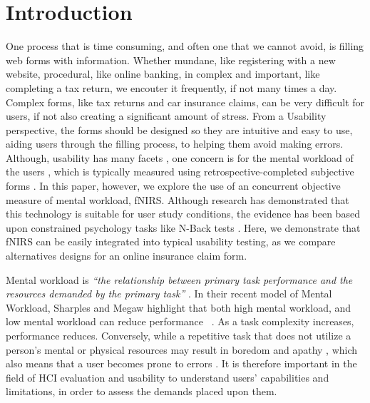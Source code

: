 \documentclass[../main/Feedback.tex]{subfiles}
\begin{document}
\section{Introduction}
One process that is time consuming, and often one that we cannot avoid, is filling web forms with information.
Whether mundane, like registering with a new website, procedural, like online banking, in complex and important, like completing a tax return, we encouter it frequently, if not many times a day. Complex forms, like tax returns and car insurance claims, can be very difficult for users, if not also creating a significant amount of stress.
From a Usability perspective, the forms should be designed so they are intuitive and easy to use, aiding users through the filling process, to helping them avoid making errors. Although, usability has many facets \cite{preece1994human}, one concern is for the mental workload of the users \cite{bevan1997methods}, which is typically measured using retrospective-completed subjective forms \cite{nasa-tlx}. In this paper, however, we explore the use of an concurrent objective measure of mental workload, fNIRS. Although research has demonstrated that this technology is suitable for user study conditions, the evidence has been based upon constrained psychology tasks like N-Back tests \cite{herff2013mental,ayaz2007detecting,molteni2008activation}. Here, we demonstrate that fNIRS can be easily integrated into typical usability testing, as we compare alternatives designs for an online insurance claim form.

Mental workload is \emph{``the relationship between primary task performance and the resources demanded by the primary task''} \cite{wilson2015evaluation}. In their recent model of Mental Workload, Sharples and Megaw highlight that both high mental workload, and low mental workload can reduce performance ~\cite{wilson2015evaluation}. As a task complexity increases, performance reduces. Conversely, while a repetitive task that does not utilize a person's mental or physical resources may result in boredom and apathy \cite{afergan2014dynamic}, which also means that a user becomes prone to errors \cite{pekrun2010boredom}.
It is therefore important in the field of HCI evaluation and usability to understand users' capabilities and limitations, in order to assess the demands placed upon them.
\end{document}
